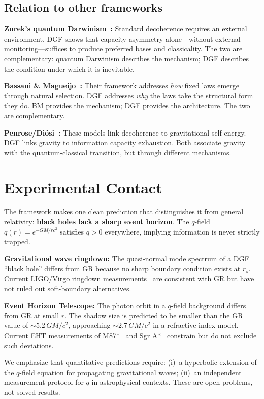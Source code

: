 \documentclass[reprint]{revtex4-2}
\begin{document}
\subsection{Relation to other frameworks}

\textbf{Zurek's quantum Darwinism~\cite{Zurek2009}:} Standard decoherence requires an external environment. DGF shows that capacity asymmetry alone---without external monitoring---suffices to produce preferred bases and classicality. The two are complementary: quantum Darwinism describes the mechanism; DGF describes the condition under which it is inevitable.

\textbf{Bassani \& Magueijo~\cite{Bassani2025}:} Their framework addresses \emph{how} fixed laws emerge through natural selection. DGF addresses \emph{why} the laws take the structural form they do. BM provides the mechanism; DGF provides the architecture. The two are complementary.

\textbf{Penrose/Di\'osi~\cite{Penrose1996,Diosi1989}:} These models link decoherence to gravitational self-energy. DGF links gravity to information capacity exhaustion. Both associate gravity with the quantum-classical transition, but through different mechanisms.

\section{Experimental Contact}

The framework makes one clean prediction that distinguishes it from general relativity: \textbf{black holes lack a sharp event horizon}. The $q$-field $q(r)=e^{-GM/rc^2}$ satisfies $q>0$ everywhere, implying information is never strictly trapped.

\textbf{Gravitational wave ringdown:} The quasi-normal mode spectrum of a DGF ``black hole'' differs from GR because no sharp boundary condition exists at $r_s$. Current LIGO/Virgo ringdown measurements~\cite{LIGO2021} are consistent with GR but have not ruled out soft-boundary alternatives.

\textbf{Event Horizon Telescope:} The photon orbit in a $q$-field background differs from GR at small $r$. The shadow size is predicted to be smaller than the GR value of $\sim 5.2\,GM/c^2$, approaching $\sim 2.7\,GM/c^2$ in a refractive-index model. Current EHT measurements of M87*~\cite{EHT2019} and Sgr A*~\cite{EHT2022} constrain but do not exclude such deviations.

We emphasize that quantitative predictions require: (i)~a hyperbolic extension of the $q$-field equation for propagating gravitational waves; (ii)~an independent measurement protocol for $q$ in astrophysical contexts. These are open problems, not solved results.
\end{document}
